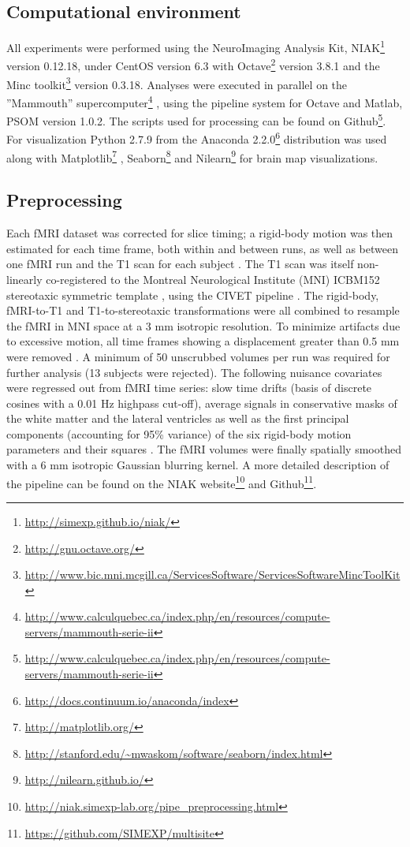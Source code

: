 \documentclass[authoryear]{elsarticle}
\begin{document}
\subsection{Computational environment}
All experiments were performed using the NeuroImaging Analysis Kit, NIAK\footnote{\url{http://simexp.github.io/niak/}} \citep{Bellec2011} version 0.12.18, under CentOS version 6.3 with Octave\footnote{\url{http://gnu.octave.org/}} version 3.8.1 and the Minc toolkit\footnote{\url{http://www.bic.mni.mcgill.ca/ServicesSoftware/ServicesSoftwareMincToolKit}} version 0.3.18. Analyses were executed in parallel on the ”Mammouth” supercomputer\footnote{\url{http://www.calculquebec.ca/index.php/en/resources/compute-servers/mammouth-serie-ii}} , using the pipeline system for Octave and Matlab, PSOM \citep{Bellec2012} version 1.0.2. The scripts used for processing can be found on Github\footnote{\url{http://www.calculquebec.ca/index.php/en/resources/compute-servers/mammouth-serie-ii}}. For visualization Python 2.7.9 from the Anaconda 2.2.0\footnote{\url{http://docs.continuum.io/anaconda/index}} distribution was used along with Matplotlib\footnote{\url{http://matplotlib.org/}} \citep{matplotlib}, Seaborn\footnote{\url{http://stanford.edu/~mwaskom/software/seaborn/index.html}} and Nilearn\footnote{\url{http://nilearn.github.io/}} for brain map visualizations.

\subsection{Preprocessing}
Each fMRI dataset was corrected for slice timing; a rigid-body motion was then estimated for each time frame, both within and between runs, as well as between one fMRI run and the T1 scan for each subject \citep{Collins1994}. The T1 scan was itself non-linearly co-registered to the Montreal Neurological Institute (MNI) ICBM152 stereotaxic symmetric template \citep{Fonov2011}, using the CIVET pipeline \citep{Ad-Dab'bagh2006}. The rigid-body, fMRI-to-T1 and T1-to-stereotaxic transformations were all combined to resample the fMRI in MNI space at a 3 mm isotropic resolution. To minimize artifacts due to excessive motion, all time frames showing a displacement greater than 0.5 mm were removed \citep{Power2012}. A minimum of 50 unscrubbed volumes per run was required for further analysis (13 subjects were rejected). The following nuisance covariates were regressed out from fMRI time series: slow time drifts (basis of discrete cosines with a 0.01 Hz highpass cut-off), average signals in conservative masks of the white matter and the lateral ventricles as well as the first principal components (accounting for 95\% variance) of the six rigid-body motion parameters and their squares \citep{Giove2009,Lund2006}. The fMRI volumes were finally spatially smoothed with a 6 mm isotropic Gaussian blurring kernel. A more detailed description of the pipeline can be found on the NIAK website\footnote{\url{http://niak.simexp-lab.org/pipe_preprocessing.html}} and Github\footnote{\url{https://github.com/SIMEXP/multisite}}.
\end{document}
